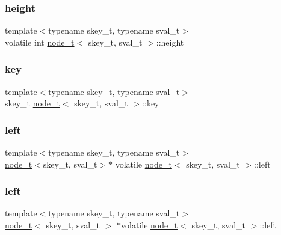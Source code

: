 \mbox{\label{structnode__t_a2399b4339a7c3ea7b7ffaa913680580a}} 
\subsubsection{\texorpdfstring{height}{height}}
{\footnotesize\ttfamily template$<$typename skey\+\_\+t, typename sval\+\_\+t$>$ \\
volatile int \hyperlink{structnode__t}{node\+\_\+t}$<$ skey\+\_\+t, sval\+\_\+t $>$\+::height}

\mbox{\label{structnode__t_ad38b63280bb7c69e5991653ce673dc35}} 
\subsubsection{\texorpdfstring{key}{key}}
{\footnotesize\ttfamily template$<$typename skey\+\_\+t, typename sval\+\_\+t$>$ \\
skey\+\_\+t \hyperlink{structnode__t}{node\+\_\+t}$<$ skey\+\_\+t, sval\+\_\+t $>$\+::key}

\mbox{\label{structnode__t_a6f9a1ea968cdda781d9d4f9ea65c5856}} 
\subsubsection{\texorpdfstring{left}{left}\hspace{0.1cm}{\footnotesize\ttfamily [1/2]}}
{\footnotesize\ttfamily template$<$typename skey\+\_\+t, typename sval\+\_\+t$>$ \\
\hyperlink{structnode__t}{node\+\_\+t}$<$skey\+\_\+t, sval\+\_\+t$>$$\ast$ volatile \hyperlink{structnode__t}{node\+\_\+t}$<$ skey\+\_\+t, sval\+\_\+t $>$\+::left}

\mbox{\label{structnode__t_a3dcf556399e1c75d881c2d700634fda0}} 
\subsubsection{\texorpdfstring{left}{left}\hspace{0.1cm}{\footnotesize\ttfamily [2/2]}}
{\footnotesize\ttfamily template$<$typename skey\+\_\+t, typename sval\+\_\+t$>$ \\
\hyperlink{structnode__t}{node\+\_\+t}$<$ skey\+\_\+t, sval\+\_\+t $>$ $\ast$volatile \hyperlink{structnode__t}{node\+\_\+t}$<$ skey\+\_\+t, sval\+\_\+t $>$\+::left}

